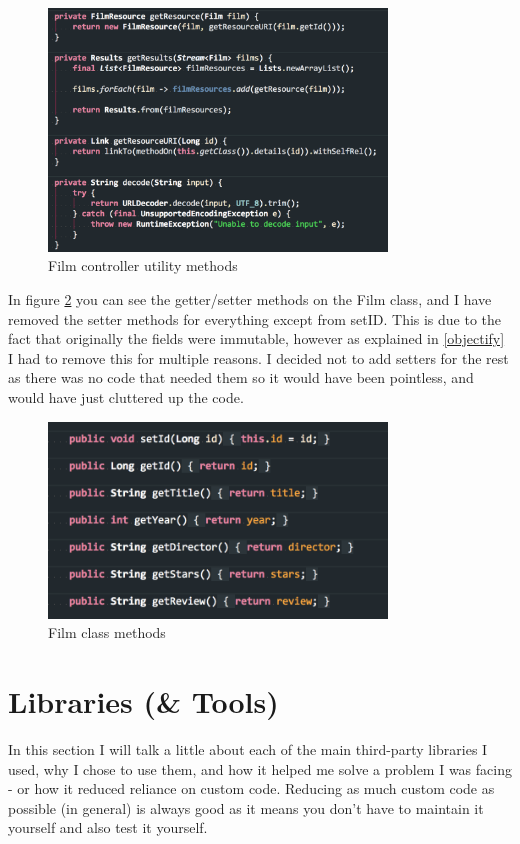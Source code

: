 \documentclass[12pt]{article}
\begin{document}
  \begin{figure}[ht]
    \centering
    \includegraphics[width=9cm]{film-controller-utilities}
    \caption{Film controller utility methods}    \label{fig:film-controller-utilities}
  \end{figure}

  In figure \ref{fig:film-methods} you can see the getter/setter methods on the Film class, and I have removed the setter methods for everything except from setID. This is due to the fact that originally the fields were immutable, however as explained in \ref{objectify} I had to remove this for multiple reasons. I decided not to add setters for the rest as there was no code that needed them so it would have been pointless, and would have just cluttered up the code.

  \begin{figure}[ht]
    \label{fig:film-methods}
    \centering
    \includegraphics[width=9cm]{film-methods}
    \caption{Film class methods}
  \end{figure}

\section{Libraries (\& Tools)}
  In this section I will talk a little about each of the main third-party libraries I used, why I chose to use them, and how it helped me solve a problem I was facing - or how it reduced reliance on custom code. Reducing as much custom code as possible (in general) is always good as it means you don't have to maintain it yourself and also test it yourself.
\end{document}
